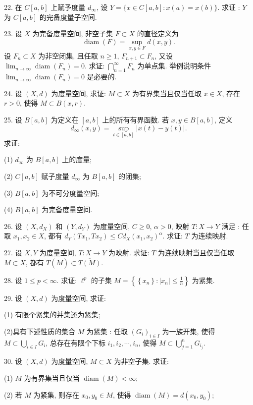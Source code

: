 \documentclass[openany]{ctexbook}
\theoremstyle{kaiti}
\theoremstyle{normal}
\begin{document}
22. 在 $C[a, b]$ 上赋予度量 $d_{\infty}$, 设 $Y=\{x \in C[a, b]: x(a)=x(b)\}$. 求证 : $Y$ 为 $C[a, b]$ 的完备度量子空间.

23. 设 $X$ 为完备度量空间, 非空子集 $F \subset X$ 的直径定义为
$$
\operatorname{diam}(F)=\sup_{x, y \in F} d(x, y).
$$
设 $F_n \subset X$ 为非空闭集, 且任取 $n \geqslant 1$, $F_{n+1} \subset F_n$, 又设 $\lim_{n \rightarrow \infty} \operatorname{diam}\left(F_n\right)=0$. 求证: $\bigcap_{n=1}^{\infty} F_n$ 为单点集. 举例说明条件 $\lim_{n \rightarrow \infty} \operatorname{diam}\left(F_n\right)=0$ 是必要的.

24. 设 $(X, d)$ 为度量空间, 求证: $M \subset X$ 为有界集当且仅当任取 $x \in X$, 存在 $r>0$, 使得 $M \subset B(x, r)$.

25. 设 $B[a, b]$ 为定义在 $[a, b]$ 上的所有有界函数. 若 $x, y \in B[a, b]$, 定义
$$
d_{\infty}(x, y)=\sup_{t \in[a, b]}|x(t)-y(t)|.
$$
求证:

(1) $d_{\infty}$ 为 $B[a, b]$ 上的度量;

(2) $C[a, b]$ 赋子度量 $d_{\infty}$ 为 $B[a, b]$ 的闭集;

(3) $B[a, b]$ 为不可分度量空间;

(4) $B[a, b]$ 为完备度量空间.

26. 设 $\left(X, d_{X}\right)$ 和 $\left(Y, d_{Y}\right)$ 为度量空间, $C \geqslant 0$, $\alpha>0$, 映射 $T: X \rightarrow Y$ 满足 : 任取 $x_1, x_2 \in X$, 都有 $d_{Y}\left(T x_1, T x_2\right) \leqslant C d_{X}\left(x_1, x_2\right)^{\alpha}$. 求证: $T$ 为连续映射.

27. 设 $X, Y$ 为度量空间, $T: X \rightarrow Y$ 为映射. 求证: $T$ 为连续映射当且仅当任取 $M \subset X$, 都有 $T(\bar{M}) \subset \overline{T(M)}$.

28. 设 $1 \leqslant p<\infty$. 求证: $\ell^{p}$ 的子集 $M=\left\{\left\{x_n\right\}:\left|x_n\right| \leqslant \frac{1}{n}\right\}$ 为紧集.

29. 设 $(X, d)$ 为度量空间, 求证:

(1) 有限个紧集的并集还为紧集;

(2)具有下述性质的集合 $M$ 为紧集 : 任取 $\left(G_{i}\right)_{i \in I}$ 为一族开集, 使得 $M \subset \bigcup_{i \in I} G_{i}$, 总存在有限个下标 $i_1, i_2, \cdots, i_n$, 使得 $M \subset \bigcup_{j=1}^n G_{i_{j}}$.

30. 设 $(X, d)$ 为度量空间, $M \subset X$ 为非空子集. 求证:

(1) $M$ 为有界集当且仅当 $\operatorname{diam}(M)<\infty$;

(2) 若 $M$ 为紧集, 则存在 $x_0, y_0 \in M$, 使得 $\operatorname{diam}(M)=d\left(x_0, y_0\right)$;
\end{document}
